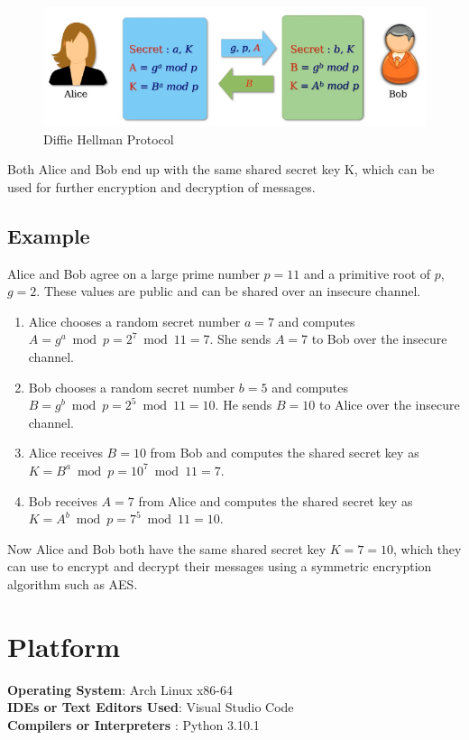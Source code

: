 \documentclass[openany]{book}
\begin{document}
\begin{figure}[H]
    \centering
    \includegraphics[width=.85\textwidth]{dh.png}
    \caption{Diffie Hellman Protocol}
\end{figure}

Both Alice and Bob end up with the same shared secret key K, which can be used for further encryption and decryption of messages.

\subsection{Example}
Alice and Bob agree on a large prime number $p=11$ and a primitive root of $p$, $g=2$. These values are public and can be shared over an insecure channel.

\begin{enumerate}
    \item Alice chooses a random secret number $a=7$ and computes $A = g^a \bmod p = 2^7 \bmod 11 = 7$. She sends $A=7$ to Bob over the insecure channel.
    \item Bob chooses a random secret number $b=5$ and computes $B = g^b \bmod p = 2^5 \bmod 11 = 10$. He sends $B=10$ to Alice over the insecure channel.
    \item Alice receives $B=10$ from Bob and computes the shared secret key as $K = B^a \bmod p = 10^7 \bmod 11 = 7$.
    \item Bob receives $A=7$ from Alice and computes the shared secret key as $K = A^b \bmod p = 7^5 \bmod 11 = 10$.
\end{enumerate}

Now Alice and Bob both have the same shared secret key $K=7=10$, which they can use to encrypt and decrypt their messages using a symmetric encryption algorithm such as AES.




\section{Platform}
\textbf{\textbf{Operating System}}: Arch Linux x86-64 \\
\textbf{\textbf{IDEs or Text Editors Used}}: Visual Studio Code\\
\textbf{\textbf{Compilers or Interpreters} }: Python 3.10.1\\
\end{document}
